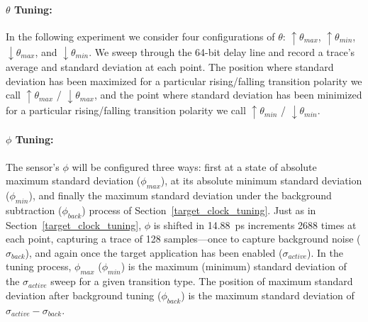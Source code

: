 

\paragraph{$\theta$ Tuning: }
In the following experiment we consider four configurations of $\theta$: $\uparrow\theta_{max}$, $\uparrow\theta_{min}$, $\downarrow\theta_{max}$, and $\downarrow\theta_{min}$.
We sweep through the 64-bit delay line and record a trace's average and standard deviation at each point.
The position where standard deviation has been maximized for a particular rising/falling transition polarity we call $\uparrow\theta_{max}$ / $\downarrow\theta_{max}$, and the point where standard deviation has been minimized for a particular rising/falling transition polarity we call $\uparrow\theta_{min}$ / $\downarrow\theta_{min}$. 

\paragraph{$\phi$ Tuning: }
The sensor's $\phi$ will be configured three ways: first at a state of absolute maximum standard deviation ($\phi_{max}$), at its absolute minimum standard deviation ($\phi_{min}$), and finally the maximum standard deviation under the background subtraction ($\phi_{back}$) process of Section~\ref{target_clock_tuning}.
Just as in Section~\ref{target_clock_tuning}, $\phi$ is shifted in 14.88~ps increments 2688 times at each point, capturing a trace of 128 samples---once to capture background noise ($\sigma_{back}$), and again once the target application has been enabled ($\sigma_{active}$).
In the tuning process, $\phi_{max}$ ($\phi_{min}$) is the maximum (minimum) standard deviation of the $\sigma_{active}$ sweep for a given transition type. The position of maximum standard deviation after background tuning ($\phi_{back}$) is the maximum standard deviation of $\sigma_{active}-\sigma_{back}$.

